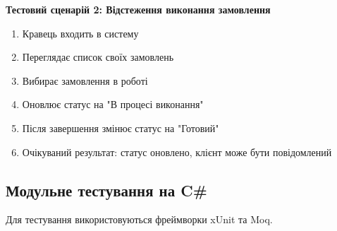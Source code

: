 \documentclass[14pt,a4paper]{extarticle}
\begin{document}
\textbf{Тестовий сценарій 2: Відстеження виконання замовлення}

\begin{enumerate}
    \item Кравець входить в систему
    \item Переглядає список своїх замовлень
    \item Вибирає замовлення в роботі
    \item Оновлює статус на "В процесі виконання"
    \item Після завершення змінює статус на "Готовий"
    \item Очікуваний результат: статус оновлено, клієнт може бути повідомлений
\end{enumerate}

\newpage
\subsection{Модульне тестування на C\#}

Для тестування використовуються фреймворки xUnit та Moq.
\end{document}
